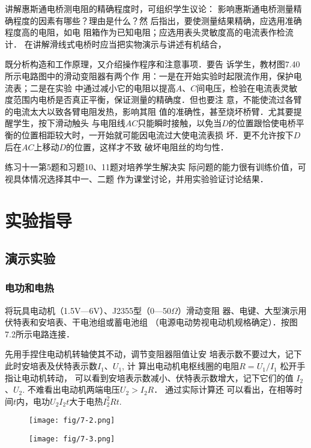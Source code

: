 讲解惠斯通电桥测电阻的精确程度时，可组织学生议论：
影响惠斯通电桥测量精确程度的因素有哪些？理由是什么？然
后指出，要使测量结果精确，应选用准确程度高的电阻，如电
阻箱作为已知电阻；应选用表头灵敏度高的电流表作检流计．
在讲解滑线式电桥时应当把实物演示与讲述有机结合，

既分析构造和工作原理，又介绍操作程序和注意事项．要告
诉学生，教材图7.40所示电路图中的滑动变阻器有两个作
用：一是在开始实验时起限流作用，保护电流表；二是在实验
中通过减小它的电阻以提高$A$、$C$间电压，检验在电流表灵敏
度范围内电桥是否真正平衡，保证测量的精确度．但也要注
意，不能使流过各臂的电流太大以致各臂电阻发热，影响其阻
值的准确性，甚至烧坏桥臂．尤其要提醒学生，按下滑动触头
与电阻线$AC$只能瞬时接触，以免当$D$的位置跟恰使电桥平
衡的位置相距较大时，一开始就可能因电流过大使电流表损
坏．更不允许按下$D$后在$AC$上移动$D$的位置，这样才不致
破坏电阻丝的均匀性．

练习十一第5题和习题10、11题对培养学生解决实
际问题的能力很有训练价值，可视具体情况选择其中一、二题
作为课堂讨论，并用实验验证讨论结果．


\section{实验指导}
\subsection{演示实验}
\subsubsection{电功和电热}
将玩具电动机（1.5V—6V）、J2355型（0—50$\Omega$）滑动变阻
器、电键、大型演示用伏特表和安培表、干电池组或蓄电池组
（电源电动势视电动机规格确定）．按图7.2所示电路连接．

先用手捏住电动机转轴使其不动，调节变阻器阻值让安
培表示数不要过大，记下此时安培表及伏特表示数$I_1$、$U_1$, 计
算出电动机电枢线圈的电阻$R=U_1/I_1$
松开手指让电动机转动，
可以看到安培表示数减小、伏特表示数增大，记下它们的值
$I_2$、$U_2$. 不难看出电动机两端电压$U_2>I_2R$． 通过实际计算还
可以看出，在相等时间$t$内，电功$U_2I_2t$大于电热$I_2^2Rt$.
\begin{figure}[htp]\centering
    \begin{minipage}[t]{0.48\textwidth}
    \centering
 \texttt{[image: fig/7-2.png]}
    \caption{}
    \end{minipage}
    \begin{minipage}[t]{0.48\textwidth}
    \centering
 \texttt{[image: fig/7-3.png]}
    \caption{}
    \end{minipage}
    \end{figure}

